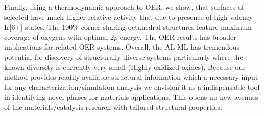 %
Finally, using a thermodynamic approach to OER, we show,
that surfaces of selected \IrOthree have much higher relative activity that \IrOtwo due to presence of high valency Ir[6+] states.
%
The \num{100}\% corner-sharing octahedral structures feature maximum coverage of oxygens with optimal $2p$-energy.
%
The OER results has broader implications for related OER systems.
%
Overall, the AL ML has tremendous potential for discovery of structurally diverse systems particularly where the known diversity is currently very small (Highly oxidized oxides).
%
Because our method provides readily available structural information which a necessary input for any characterization/simulation analysis we envision it as a indispensable tool in identifying novel phases for materials applications.
%
This opens up new avenues of the materials/catalysis research with tailored structural properties.


